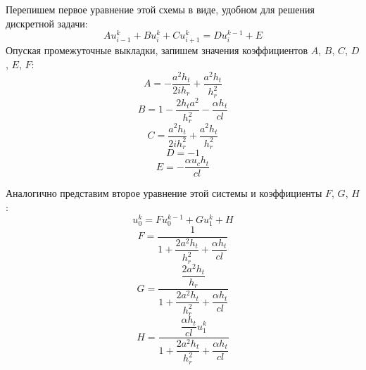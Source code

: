 \documentclass[a4paper,12pt,russian, fleqn]{extreport}
\begin{document}
	Перепишем первое уравнение этой схемы в виде, удобном для решения дискретной задачи:
	\begin{equation*}
		Au^k_{i-1} + Bu^k_i + Cu^k_{i+1} = Du_i^{k-1} + E
	\end{equation*}
	Опуская промежуточные выкладки, запишем значения коэффициентов $A$, $B$, $C$, $D$, $E$, $F$:
	\begin{equation*}
		A = -\dfrac{a^2h_t}{2ih_r} + \dfrac{a^2h_t}{h_r^2}
	\end{equation*}
	\begin{equation*}
		B = 1 - \dfrac{2h_ta^2}{h_r^2} - \dfrac{\alpha h_t}{cl}
	\end{equation*}
	\begin{equation*}
		C = \dfrac{a^2h_t}{2ih_r^2} + \dfrac{a^2h_t}{h_r^2}
	\end{equation*}
	\begin{equation*}
		D = -1
	\end{equation*}
	\begin{equation*}
		E = - \dfrac{\alpha u_c h_t}{cl}
	\end{equation*}
	
	Аналогично представим второе уравнение этой системы и коэффициенты $F$, $G$, $H$:
	\begin{equation*}
		u_0^k = Fu_0^{k-1} + Gu_1^k + H
	\end{equation*}
	\begin{equation*}
		F = \dfrac{1}{1 + \dfrac{2a^2h_t}{h_r^2} + \dfrac{\alpha h_t}{cl}}
	\end{equation*}
	\begin{equation*}
		G = \dfrac{\dfrac{2a^2h_t}{h_r}}{1 + \dfrac{2a^2h_t}{h_r^2} + \dfrac{\alpha h_t}{cl}}
	\end{equation*}
	\begin{equation*}
		H = \dfrac{\dfrac{\alpha h_t}{cl}u_1^k}{1 + \dfrac{2a^2h_t}{h_r^2} + \dfrac{\alpha h_t}{cl}}
	\end{equation*}
	\newpage
\end{document}
